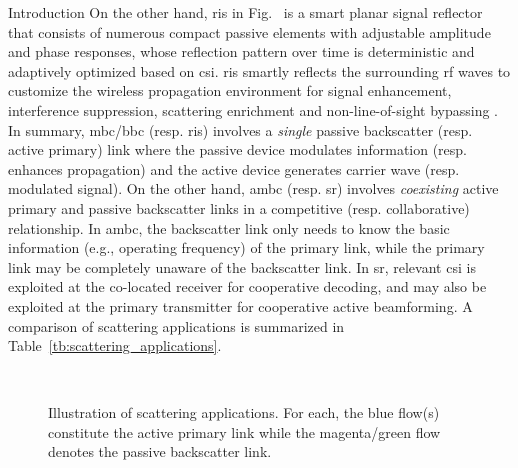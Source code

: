 \documentclass[journal,12pt,onecolumn,draftclsnofoot]{IEEEtran}
\theoremstyle{remark}
\begin{document}
\begin{section}{Introduction}
	On the other hand, \gls{ris} in Fig.~ is a smart planar signal reflector that consists of numerous compact passive elements with adjustable amplitude and phase responses, whose reflection pattern over time is deterministic and adaptively optimized based on \gls{csi}.
	\gls{ris} smartly reflects the surrounding \gls{rf} waves to customize the wireless propagation environment for signal enhancement, interference suppression, scattering enrichment and non-line-of-sight bypassing \cite{Wu2021b}.
	In summary, \gls{mbc}/\gls{bbc} (resp. \gls{ris}) involves a \emph{single} passive backscatter (resp. active primary) link where the passive device modulates information (resp. enhances propagation) and the active device generates carrier wave (resp. modulated signal).
	On the other hand, \gls{ambc} (resp. \gls{sr}) involves \emph{coexisting} active primary and passive backscatter links in a competitive (resp. collaborative) relationship.
	In \gls{ambc}, the backscatter link only needs to know the basic information (e.g., operating frequency) of the primary link, while the primary link may be completely unaware of the backscatter link.
	In \gls{sr}, relevant \gls{csi} is exploited at the co-located receiver for cooperative decoding, and may also be exploited at the primary transmitter for cooperative active beamforming.
	A comparison of scattering applications is summarized in Table~\ref{tb:scattering_applications}.

	\begin{figure}[!t]
		\centering
		\\
		\subfloat[\gls{sr}]{
			\resizebox{0.25\linewidth}{!}{
				
			}
			\label{fg:sr}
		}
		\subfloat[RIScatter]{
			\resizebox{0.25\linewidth}{!}{
				
			}
			\label{fg:riscatter}
		}
		\caption{
			Illustration of scattering applications.
			For each, the blue flow(s) constitute the active primary link while the magenta/green flow denotes the passive backscatter link.
		}
		\label{fg:scatter_illustration}
	\end{figure}


\end{section}
\end{document}
